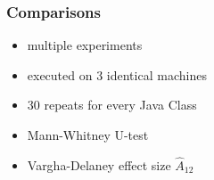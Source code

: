 \begin{frame}
	\frametitle{Comparisons}
	
	\begin{itemize}
		\item multiple experiments
		\item executed on 3 identical machines
		\item 30 repeats for every Java Class
		\item Mann-Whitney U-test
		\item Vargha-Delaney effect size $\hat{A}_{12}$
	\end{itemize}
	
\end{frame}

